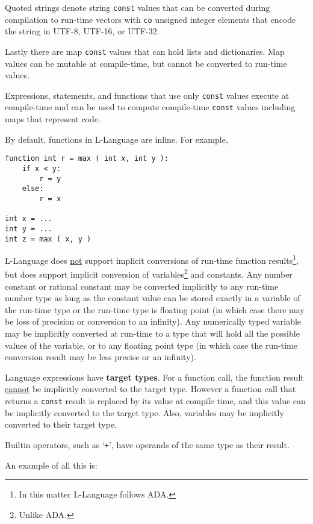 \documentclass[12pt]{article}
\newcommand{\skey}[2]{{\rm \bfseries #1#2}}
\newenvironment{indpar}[1][0.3in]%
	{\begin{list}{}%
		     {\setlength{\itemsep}{0in}%
		      \setlength{\topsep}{0in}%
		      \setlength{\parsep}{1ex}%
		      \setlength{\labelwidth}{#1}%
		      \setlength{\leftmargin}{#1}%
		      \addtolength{\leftmargin}{\labelsep}}%
	 \item}%
	{\end{list}}
\begin{document}
Quoted strings denote string {\tt const} values that can be
converted during compilation to run-time vectors
with {\tt co} unsigned integer elements that encode the
string in UTF-8, UTF-16, or UTF-32.

Lastly there are map {\tt const} values that can hold lists
and dictionaries.  Map values can be mutable at compile-time,
but cannot be converted to run-time values.

Expressions, statements, and functions that use only {\tt const} values
execute at compile-time and can be used to compute compile-time
{\tt const} values including maps that represent code.

By default, functions in L-Language are inline.  For example,

\begin{indpar}\begin{verbatim}
function int r = max ( int x, int y ):
    if x < y:
        r = y
    else:
        r = x

int x = ...
int y = ...
int z = max ( x, y )
\end{verbatim}\end{indpar}

L-Language does \underline{not} support implicit conversions of
run-time function results\footnote{In this matter L-Language follows ADA.},
but does support implicit conversion of variables\footnote{Unlike ADA.}
and constants.  Any number constant or rational constant may be
converted implicitly to any run-time number type as long as
the constant value can be stored exactly in a variable
of the run-time type or the run-time type is floating point
(in which case there may be loss of precision or conversion to
an infinity).
Any numerically typed variable may be implicitly converted
at run-time to a type that will hold all the possible values of
the variable, or to any floating point type
(in which case the run-time conversion result
may be less precise or an infinity).

Language expressions have \skey{target type}s.
For a function call, the function result \underline{cannot}
be implicitly converted to the target type.
However a function call that returns a {\tt const}
result is replaced by its value at compile time, and this value
can be implicitly converted to the target type.  Also, variables
may be implicitly converted to their target type.

Builtin operators, such as `{\tt +}',
have operands of the same type as their result.

An example of all this is:
\end{document}
